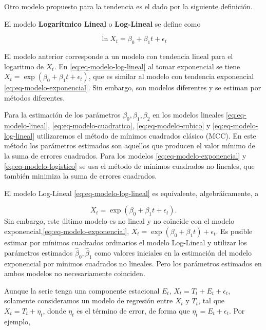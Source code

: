 \documentclass[12pt,]{krantz}
\theoremstyle{definition}
\theoremstyle{definition}
\theoremstyle{definition}
\theoremstyle{remark}
\let\BeginKnitrBlock\begin \let\EndKnitrBlock\end
\begin{document}
Otro modelo propuesto para la tendencia es el dado por la siguiente
definición.

\BeginKnitrBlock{definition}
\protect\hypertarget{def:defi-modelo-log-lineal}{}{\label{def:defi-modelo-log-lineal}
}El modelo \textbf{Logarítmico Lineal} o \textbf{Log-Lineal} se define
como

\begin{equation}
\ln X_t = \beta_0+\beta_1t + \epsilon_t
\label{eq:eq-modelo-log-lineal}
\end{equation}
\EndKnitrBlock{definition}

El modelo anterior corresponde a un modelo con tendencia lineal para el
logaritmo de \(X_t\). En \eqref{eq:eq-modelo-log-lineal} al tomar
exponencial se tiene \(X_t = \exp(\beta_0+\beta_1t + \epsilon_t)\), que
es similar al modelo con tendencia exponencial
\eqref{eq:eq-modelo-exponencial}. Sin embargo, son modelos diferentes y se
estiman por métodos diferentes.

Para la estimación de los parámetros \(\beta_0,\beta_1,\beta_2\) en los
modelos lineales \eqref{eq:eq-modelo-lineal},
\eqref{eq:eq-modelo-cuadratico}, \eqref{eq:eq-modelo-cubico} y
\eqref{eq:eq-modelo-log-lineal} utilizaremos el método de mínimos
cuadrados clásico (MCC). En este método los parámetros estimados son
aquellos que producen el valor mínimo de la suma de errores cuadrados.
Para los modelos \eqref{eq:eq-modelo-exponencial} y
\eqref{eq:eq-modelo-logistico} se usa el método de mínimos cuadrados no
lineales, que también minimiza la suma de errores cuadrados.

El modelo Log-Lineal \eqref{eq:eq-modelo-log-lineal} es equivalente,
algebráicamente, a

\[X_t = \exp(\beta_0 + \beta_1t + \epsilon_t).\] Sin embargo, este
último modelo es no lineal y no coincide con el modelo
exponencial,\eqref{eq:eq-modelo-exponencial},
\(X_t = \exp(\beta_0+\beta_1t)+\epsilon_t\). Es posible estimar por
mínimos cuadrados ordinarios el modelo Log-Lineal y utilizar los
parámetros estimados \(\hat{\beta}_0,\hat{\beta}_1\) como valores
iniciales en la estimación del modelo exponencial por mínimos cuadrados
no lineales. Pero los parámetros estimados en ambos modelos no
necesariamente coinciden.

Aunque la serie tenga una componente estacional \(E_t\),
\(X_t = T_t + E_t + \epsilon_t\), solamente consideramos un modelo de
regresión entre \(X_t\) y \(T_t\), tal que \(X_t = T_t + \eta_t\), donde
\(\eta_t\) es el término de error, de forma que
\(\eta_t=E_t+\epsilon_t\). Por ejemplo,
\end{document}
